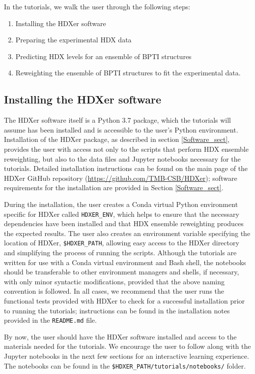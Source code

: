 \documentclass[9pt,tutorial]{livecoms}
\begin{document}
In the tutorials, we walk the user through the following steps:
\begin{enumerate}
  \item Installing the HDXer software
  \item Preparing the experimental HDX data
  \item Predicting HDX levels for an ensemble of BPTI structures
  \item Reweighting the ensemble of BPTI structures to fit the experimental data.
\end{enumerate}

\subsection{Installing the HDXer software}
The HDXer software itself is a Python 3.7 package, which the tutorials will assume has been installed and is accessible to the user's Python environment.
Installation of the HDXer package, as described in section \ref{Software_sect}, provides the user with access not only to the scripts that perform HDX ensemble reweighting, but also to the data files and Jupyter notebooks necessary for the tutorials.
Detailed installation instructions can be found on the main page of the HDXer GitHub repository (\url{https://github.com/TMB-CSB/HDXer}); software requirements for the installation are provided in Section \ref{Software_sect}. 

During the installation, the user creates a Conda virtual Python environment specific for HDXer called \texttt{HDXER\_ENV}, which helps to ensure that the necessary dependencies have been installed and that HDX ensemble reweighting produces the expected results. 
The user also creates an environment variable specifying the location of HDXer, \texttt{\$HDXER\_PATH}, allowing easy access to the HDXer directory and simplifying the process of running the scripts.
Although the tutorials are written for use with a Conda virtual environment and Bash shell, the notebooks should be transferable to other environment managers and shells, if necessary, with only minor syntactic modifications, provided that the above naming convention is followed. 
In all cases, we recommend that the user runs the functional tests provided with HDXer to check for a successful installation prior to running the tutorials; instructions can be found in the installation notes provided in the \texttt{README.md} file. 

By now, the user should have the HDXer software installed and access to the materials needed for the tutorials. We encourage the user to follow along with the Jupyter notebooks in the next few sections for an interactive learning experience.
The notebooks can be found in the \texttt{\$HDXER\_PATH/tutorials/notebooks/} folder.
\end{document}
